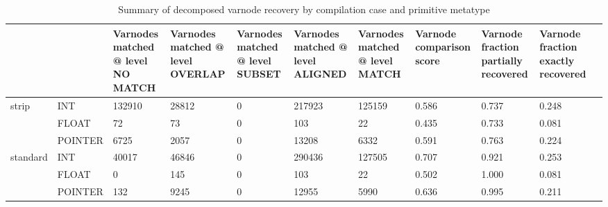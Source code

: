 \begin{table}
\centering
\caption{Summary of decomposed varnode recovery by compilation case and primitive metatype}
\label{table:opts-varnodes-summary-metatypes-decomposed}
\begin{tabular}{lp{1.43cm}p{1.10cm}p{1.10cm}p{1.10cm}p{1.10cm}p{1.10cm}p{1.10cm}p{1.10cm}p{1.10cm}p{1.10cm}}
\toprule
      &         &  Varnodes matched @ level NO MATCH &  Varnodes matched @ level OVERLAP &  Varnodes matched @ level SUBSET &  Varnodes matched @ level ALIGNED &  Varnodes matched @ level MATCH &  Varnode comparison score &  Varnode fraction partially recovered &  Varnode fraction exactly recovered \\
\midrule
\multirow{3}{*}{strip} & INT &                             132910 &                             28812 &                                0 &                            217923 &                          125159 &                     0.586 &                                 0.737 &                               0.248 \\
      & FLOAT &                                 72 &                                73 &                                0 &                               103 &                              22 &                     0.435 &                                 0.733 &                               0.081 \\
      & POINTER &                               6725 &                              2057 &                                0 &                             13208 &                            6332 &                     0.591 &                                 0.763 &                               0.224 \\
\cline{1-10}
\multirow{3}{*}{standard} & INT &                              40017 &                             46846 &                                0 &                            290436 &                          127505 &                     0.707 &                                 0.921 &                               0.253 \\
      & FLOAT &                                  0 &                               145 &                                0 &                               103 &                              22 &                     0.502 &                                 1.000 &                               0.081 \\
      & POINTER &                                132 &                              9245 &                                0 &                             12955 &                            5990 &                     0.636 &                                 0.995 &                               0.211 \\

\end{tabular}
\end{table}
